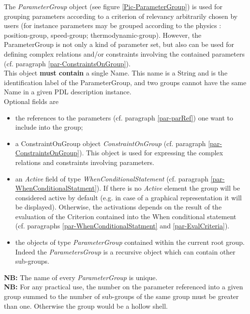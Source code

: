 \documentclass[a4paper,11pt] {ivoa}
\begin{document}
The {\it ParameterGroup} object (see figure \ref{Pic-ParameterGroup}) is used for grouping
parameters according to a criterion of relevancy arbitrarily chosen by users (for instance
parameters may be grouped according to the physics : position-group, speed-group; thermodynamic-group).
However,  the ParameterGroup is not only a kind of parameter set, but also can be used for
defining complex relations and/or constraints involving the contained parameters (cf. paragraph
\ref{par-ConstraintsOnGroup}).\\
This object {\bf must contain} a single Name. This name is a String and is the identification label
of the ParameterGroup, and two groups cannot have the same Name in a given PDL description instance.\\
Optional fields are
\begin{itemize}
\item the references to the parameters (cf. paragraph \ref{par-parRef}) one want to include into the
group;
\item a  ConstraintOnGroup object {\it ConstraintOnGroup} (cf. paragraph 
\ref{par-ConstraintsOnGroup}). This object is used for expressing the complex relations and
constraints involving parameters.
\item an  {\it Active} field of type {\it WhenConditionalStatement} (cf. paragraph \ref{par-WhenConditionalStatment}). If there is no {\it Active} element the group will be considered active by default  (e.g. in case of a graphical representation it will be displayed). Otherwise, the activations depends on the result of the evaluation of the Criterion contained into the  When conditional statement (cf. paragraphs \ref{par-WhenConditionalStatment} and \ref{par-EvalCriteria}).

 
\item the objects of type {\it ParameterGroup} contained within the current root group. Indeed the
{\it ParametersGroup} is a recursive object which can contain other sub-groups.
\end{itemize}

{\bf NB:} The name of every {\it ParameterGroup} is unique.\\

{\bf NB:}  For any practical use, the number on the parameter referenced into a given group summed
to the number of sub-groups of the same group must be greater than one. Otherwise the group would be
a hollow shell.
\end{document}
